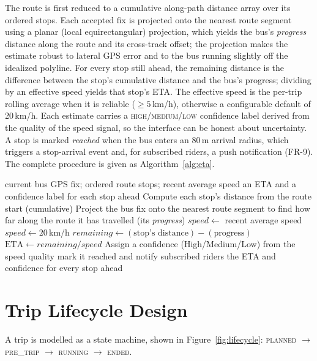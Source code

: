 The route is first reduced to a cumulative along-path distance array over
its ordered stops. Each accepted fix is projected onto the nearest route
segment using a planar (local equirectangular) projection, which yields
the bus's \emph{progress} distance along the route and its cross-track
offset; the projection makes the estimate robust to lateral GPS error and
to the bus running slightly off the idealized polyline. For every stop
still ahead, the remaining distance is the difference between the stop's
cumulative distance and the bus's progress; dividing by an effective
speed yields that stop's ETA. The effective speed is the per-trip
rolling average when it is reliable ($\geq 5$\,km/h), otherwise a
configurable default of 20\,km/h. Each estimate carries a
\textsc{high}/\textsc{medium}/\textsc{low} confidence label derived from
the quality of the speed signal, so the interface can be honest about
uncertainty. A stop is marked \emph{reached} when the bus enters an
80\,m arrival radius, which triggers a stop-arrival event and, for
subscribed riders, a push notification (FR-9). The complete procedure is
given as Algorithm~\ref{alg:eta}.

\begin{algorithm}[H]
\caption{Estimating the ETA to every upcoming stop}
\label{alg:eta}
\begin{algorithmic}[1]
\Require current bus GPS fix; ordered route stops; recent average speed
\Ensure an ETA and a confidence label for each stop ahead
\State Compute each stop's distance from the route start (cumulative)
\State Project the bus fix onto the nearest route segment to find how far
  along the route it has travelled (its \emph{progress})
  \State $speed \gets$ recent average speed
\Else
  \State $speed \gets 20$\,km/h 
\EndIf
{}
  \State $remaining \gets (\text{stop's distance}) - (\text{progress})$
  \State $\text{ETA} \gets remaining / speed$
\EndFor
\State Assign a confidence (High/Medium/Low) from the speed quality
  \State mark it reached and notify subscribed riders
\EndIf
\State \Return the ETA and confidence for every stop ahead
\end{algorithmic}
\end{algorithm}

\section{Trip Lifecycle Design}
\label{sec:design-lifecycle}
A trip is modelled as a state machine, shown in
Figure~\ref{fig:lifecycle}:
\textsc{planned} $\rightarrow$ \textsc{pre\_trip} $\rightarrow$
\textsc{running} $\rightarrow$ \textsc{ended}.

